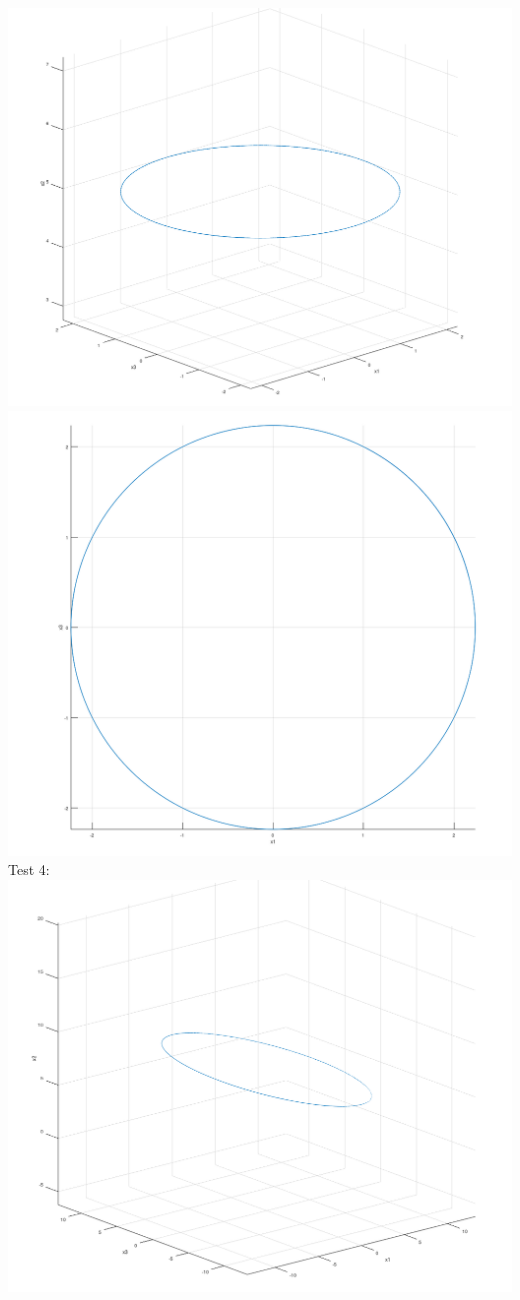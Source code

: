 \documentclass[12pt, letterpaper, twoside]{article}    %
\begin{document}
\includegraphics[width=\textwidth]{test31}
\includegraphics[width=\textwidth]{test32}
\newpage
Test 4: \\
\includegraphics[width=\textwidth]{test41}
\end{document}
